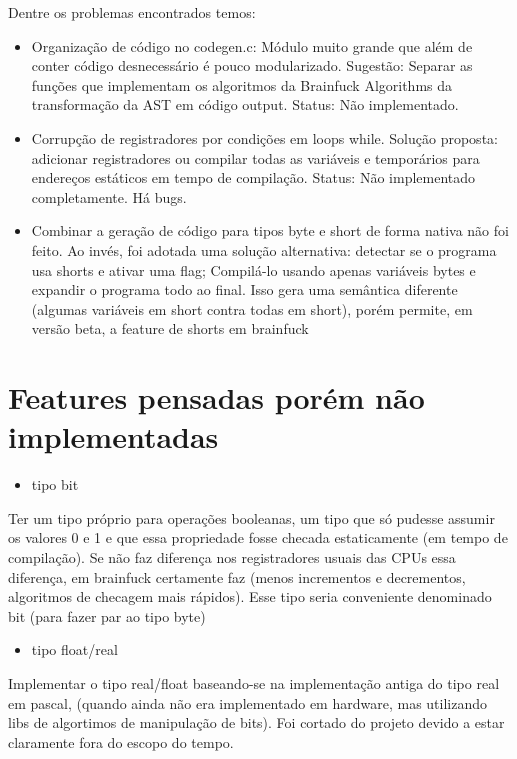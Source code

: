 Dentre os problemas encontrados temos:

\begin{itemize}
    \item Organização de código no codegen.c: Módulo muito grande que além de conter código desnecessário é pouco modularizado. Sugestão: Separar as funções que implementam os algoritmos da Brainfuck Algorithms da transformação da AST em código output. Status: Não implementado.
    \item Corrupção de registradores por condições em loops while. Solução proposta: adicionar registradores ou compilar todas as variáveis e temporários para endereços estáticos em tempo de compilação. Status: Não implementado completamente. Há bugs.
    \item Combinar a geração de código para tipos byte e short de forma nativa não foi feito. Ao invés, foi adotada uma solução alternativa: detectar se o programa usa shorts e ativar uma flag; Compilá-lo usando apenas variáveis bytes e expandir o programa todo ao final. Isso gera uma semântica diferente (algumas variáveis em short contra todas em short), porém permite, em versão beta, a feature de shorts em brainfuck
\end{itemize}

\section{Features pensadas porém não implementadas}

\begin{itemize}
    \item tipo bit
\end{itemize}

Ter um tipo próprio para operações booleanas, um tipo que só pudesse assumir os valores 0 e 1 e que essa propriedade fosse checada estaticamente (em tempo de compilação). Se não faz diferença nos registradores usuais das CPUs essa diferença, em brainfuck certamente faz (menos incrementos e decrementos, algoritmos de checagem mais rápidos). Esse tipo seria conveniente denominado bit (para fazer par ao tipo byte)

\begin{itemize}
    \item tipo float/real
\end{itemize}

Implementar o tipo real/float baseando-se na implementação antiga do tipo real em pascal, (quando ainda não era implementado em hardware, mas utilizando libs de algortimos de manipulação de bits). Foi cortado do projeto devido a estar claramente fora do escopo do tempo.

